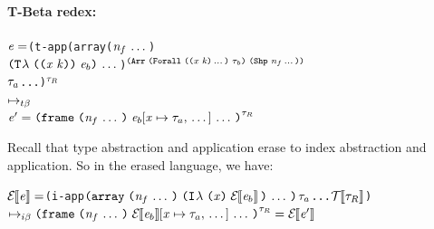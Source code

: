 \begin{sproof}
  \paragraph{T-Beta redex:}
  \newcommand{\tbetafnannot}
  {\typearray
    {\typeuniv
      {\sequence{\notevar{\var}{\kind}}}
      {\type_b}}
    {\idxshape{\sequence{\nat_f}}}}
  \newcommand{\tbetafn}
  {\notedarrlit[\tbetafnannot]
    {\sequence{\tlam{\notevar{\var}{\kind}}{\expr_b}}}
    {\sequence{\nat_f}}}
  \newcommand{\tbetaresult}
  {\notedfrm[\type_R]
    {\sequence{\seqsubst{\expr_b}{\var}{\type_a}}}
    {\sequence{\nat_f}}}
  \newcommand{\erasedtbetafn}
  {\arrlit
    {\sequence{\ilam{\var}{\EraseE{\expr_b}}}}
    {\sequence{\nat_f}}}
  \newcommand{\erasedtbetaresult}
  {\notedfrm[\type_R]
    {\sequence{\seqsubst{\EraseE{\expr_b}}{\var}{\type_a}}}
    {\sequence{\nat_f}}}
\begin{alltt}
\(\expr = \)(t-app (array (\(\sequence{\nat\sb{f}}\))\\
\phantom{\(\expr = \)(t-app (array }\(\sequence{\tlam{\notevar{\var}{\kind}}{\expr\sb{b}}}\))\(\sp{\tbetafnannot}\)\\
\phantom{\(\expr = \) }\(\type\sb{a}\) ...)\(\sp{\type\sb{R}}\)\\
\(\mapsto\sb{t\beta}\)\\
\(\expr' = \tbetaresult\)
\end{alltt}
Recall that type abstraction and application erase to index abstraction and application.
So in the erased language, we have:
\begin{alltt}
\(\EraseE{\expr} = \)(i-app \(\erasedtbetafn\) \(\type\sb{a}\) ... \(\EraseT{\type\sb{R}}\))\\
\(\mapsto\sb{i\beta} \erasedtbetaresult = \EraseE{\expr'}\)
\end{alltt}


\end{sproof}
